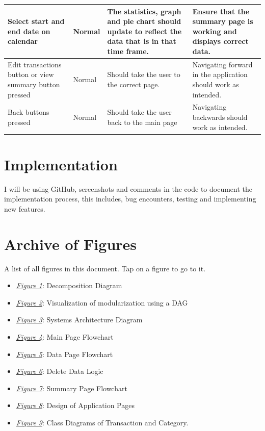 \documentclass{article}
\newcommand{\jumpTo}[1]{\textcolor{blue}{#1}}
\begin{document}
\begin{longtable}{|p{3cm}|p{2cm}|p{3cm}|p{4cm}|}
    \hline
    Select start and end date on calendar & Normal & The statistics, graph and pie chart should update to reflect the data that is in that time frame. & Ensure that the summary page is working and displays correct data.\\
    \hline
    Edit transactions button or view summary button pressed & Normal & Should take the user to the correct page. & Navigating forward in the application should work as intended.\\
    \hline
    Back buttons pressed & Normal & Should take the user back to the main page & Navigating backwards should work as intended.\\
    \hline
\end{longtable}

\section{Implementation}
I will be using GitHub, screenshots and comments in the code to document the implementation process, this includes, bug encounters, testing and implementing new features.

\newpage %
\section{Archive of Figures}
A list of all figures in this document.
Tap on a figure to go to it.
\begin{itemize}
    \item \jumpTo{\textit{\hyperref[fig:FHDecomp]{Figure 1}}}: Decomposition Diagram
    \item \jumpTo{\textit{\hyperref[fig:ModularDAG]{Figure 2}}}: Visualization of modularization using a DAG
    \item \jumpTo{\textit{\hyperref[fig:SystemsDiagram]{Figure 3}}}: Systems Architecture Diagram
    \item \jumpTo{\textit{\hyperref[fig:MainPage]{Figure 4}}}: Main Page Flowchart
    \item \jumpTo{\textit{\hyperref[fig:DataPage]{Figure 5}}}: Data Page Flowchart
    \item \jumpTo{\textit{\hyperref[fig:Delete]{Figure 6}}}: Delete Data Logic
    \item \jumpTo{\textit{\hyperref[fig:SummaryPage]{Figure 7}}}: Summary Page Flowchart
    \item \jumpTo{\textit{\hyperref[fig:PageDesign]{Figure 8}}}: Design of Application Pages
    \item \jumpTo{\textit{\hyperref[fig:ClassDiagram]{Figure 9}}}: Class Diagrams of Transaction and Category.
\end{itemize}
\end{document}
